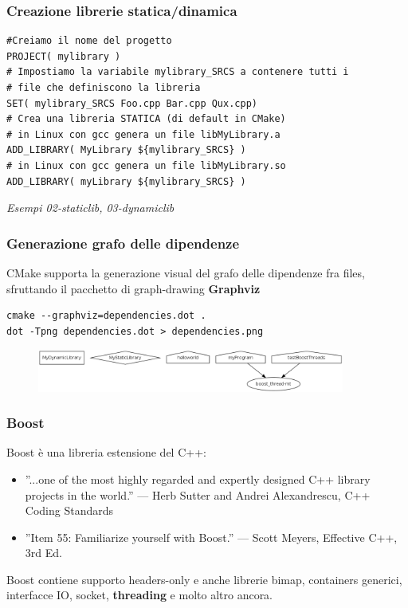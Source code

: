 \documentclass[10pt] {beamer}
\begin{document}

\begin{frame}[fragile]
	\frametitle{Creazione librerie statica/dinamica}
\begin{verbatim}
#Creiamo il nome del progetto
PROJECT( mylibrary )
# Impostiamo la variabile mylibrary_SRCS a contenere tutti i 
# file che definiscono la libreria
SET( mylibrary_SRCS Foo.cpp Bar.cpp Qux.cpp)
# Crea una libreria STATICA (di default in CMake) 
# in Linux con gcc genera un file libMyLibrary.a
ADD_LIBRARY( MyLibrary ${mylibrary_SRCS} )
# in Linux con gcc genera un file libMyLibrary.so
ADD_LIBRARY( myLibrary ${mylibrary_SRCS} )
\end{verbatim}

\emph{Esempi 02-staticlib, 03-dynamiclib}

\end{frame}


\begin{frame}[fragile]
 \frametitle{Generazione grafo delle dipendenze}
CMake supporta la generazione visual del grafo delle dipendenze fra files, sfruttando il pacchetto di graph-drawing \textbf{Graphviz}
\begin{verbatim}
cmake --graphviz=dependencies.dot .
dot -Tpng dependencies.dot > dependencies.png
\end{verbatim}
\begin{figure}[htb]
 \centering
 \includegraphics[width=0.9\textwidth]{images/dependencies.png}
\end{figure}
\end{frame}



\begin{frame}[fragile]
\frametitle{Boost}
Boost è una libreria estensione del C++:
\begin{itemize}
\item ''...one of the most highly regarded and expertly designed C++ library projects in the world.''
— Herb Sutter and Andrei Alexandrescu, C++ Coding Standards
\item ''Item 55: Familiarize yourself with Boost.''
— Scott Meyers, Effective C++, 3rd Ed.
\end{itemize}
Boost contiene supporto headers-only e anche librerie bimap, containers generici, interfacce IO, socket, \textbf{threading} e molto altro ancora.
\end{frame}
\end{document}

